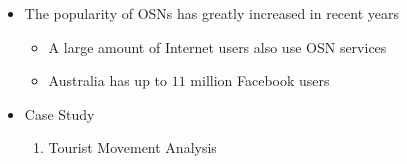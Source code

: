 \documentclass{tikzposter} %
\begin{document}
\begin{columns}
{\begin{itemize}
\item The popularity of OSNs has greatly increased in recent years

\begin{itemize}
\item
A large amount of Internet users also use OSN services

\item
Australia has up to $11$ million Facebook users
\end{itemize}

\item Case Study

\begin{enumerate}
    \item
    Tourist Movement Analysis

    {
    \begin{minipage}{0.3\linewidth}
      \centering

\end{minipage}}
\end{enumerate}
\end{itemize}}
\end{columns}
\end{document}
